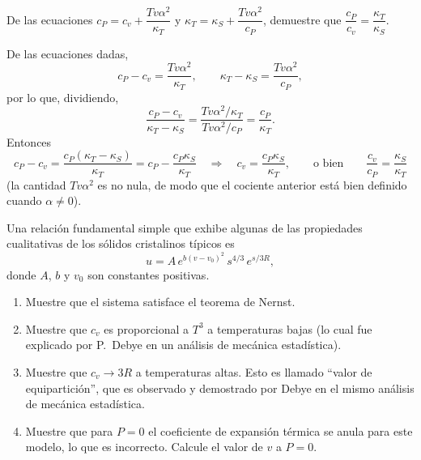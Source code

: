 \begin{ejercicio}[3.9.5]
  De las ecuaciones $c_P=c_v+\dfrac{Tv\alpha^{2}}{\kappa_T}$ y $\kappa_T=\kappa_S+\dfrac{Tv\alpha^{2}}{c_P}$,
  demuestre que $\dfrac{c_P}{c_v}=\dfrac{\kappa_T}{\kappa_S}$.
\end{ejercicio}

\begin{solucion}
  De las ecuaciones dadas,
  \begin{equation*}
    c_P-c_v=\frac{Tv\alpha^{2}}{\kappa_T},\qquad\kappa_T-\kappa_S=\frac{Tv\alpha^{2}}{c_P},
  \end{equation*}
  por lo que, dividiendo,
  \begin{equation*}
    \frac{c_P-c_v}{\kappa_T-\kappa_S}=\frac{Tv\alpha^{2}/\kappa_T}{Tv\alpha^{2}/c_P}=\frac{c_P}{\kappa_T}.
  \end{equation*}
  Entonces
  \begin{equation*}
    c_P-c_v=\frac{c_P(\kappa_T-\kappa_S)}{\kappa_T}=c_P-\frac{c_P\kappa_S}{\kappa_T}
    \quad\Longrightarrow\quad
    c_v=\frac{c_P\kappa_S}{\kappa_T},
    \qquad\text{o bien}\qquad
    \boxed{\frac{c_v}{c_P}=\frac{\kappa_S}{\kappa_T}}
  \end{equation*}
  (la cantidad $Tv\alpha^{2}$ es no nula, de modo que el cociente anterior está bien definido cuando
  $\alpha\neq0$).
\end{solucion}

\begin{ejercicio}[3.9.6]
  Una relación fundamental simple que exhibe algunas de las propiedades cualitativas de los sólidos
  cristalinos típicos es
  \begin{equation*}
    u=A\,e^{b(v-v_0)^{2}}\,s^{4/3}\,e^{s/3R},
  \end{equation*}
  donde $A$, $b$ y $v_0$ son constantes positivas.
  \begin{enumerate}[label=\alph*),itemsep=2pt]
    \item Muestre que el sistema satisface el teorema de Nernst.
    \item Muestre que $c_v$ es proporcional a $T^{3}$ a temperaturas bajas (lo cual fue explicado por
      P.\ Debye en un análisis de mecánica estadística).
    \item Muestre que $c_v\to3R$ a temperaturas altas. Esto es llamado ``valor de equipartición'', que
      es observado y demostrado por Debye en el mismo análisis de mecánica estadística.
    \item Muestre que para $P=0$ el coeficiente de expansión térmica se anula para este modelo, lo que
      es incorrecto. Calcule el valor de $v$ a $P=0$.
  \end{enumerate}
\end{ejercicio}

